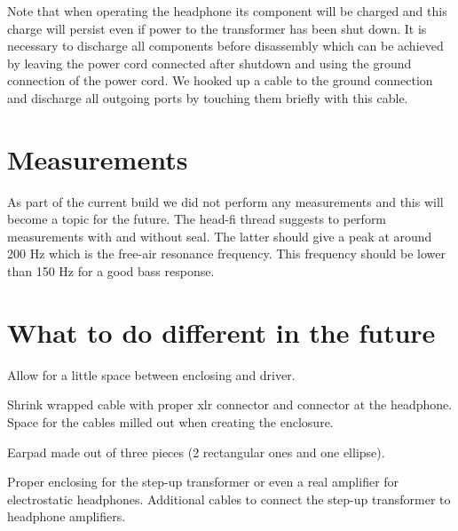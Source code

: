 \documentclass{article}
\begin{document}
Note that when operating the headphone its component will be charged and this charge will persist even if power to the transformer has been shut down. It is necessary to discharge all components before disassembly which can be achieved by leaving the power cord connected after shutdown and using the ground connection of the power cord. We hooked up a cable to the ground connection and discharge all outgoing ports by touching them briefly with this cable.

%
%
%
%

\section{Measurements}
\label{s:measurements}

As part of the current build we did not perform any measurements and this will become a topic for the future. The head-fi thread suggests to perform measurements with and without seal. The latter should give a peak at around 200 Hz which is the free-air resonance frequency. This frequency should be lower than 150 Hz for a good bass response.

\section{What to do different in the future}
\label{s:future}

Allow for a little space between enclosing and driver.

Shrink wrapped cable with proper xlr connector and connector at the headphone. Space for the cables milled out when creating the enclosure.

Earpad made out of three pieces (2 rectangular ones and one ellipse).

Proper enclosing for the step-up transformer or even a real amplifier for electrostatic headphones. Additional cables to connect the step-up transformer to headphone amplifiers.
\end{document}
